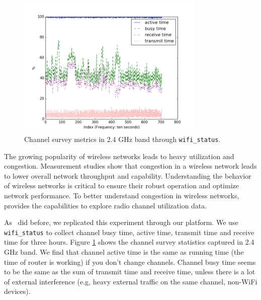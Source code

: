 \begin{figure}
\centering
\includegraphics[width=0.8\textwidth]{figure/channel.png}
\caption{Channel survey metrics in 2.4 GHz band through \texttt{wifi\_status}.} 
\label{fig:channelsurvey}
\end{figure}

The growing popularity of wireless networks leads to heavy utilization and congestion. Measurement studies show that congestion in a wireless network leads to lower overall network throughput and capability. Understanding the behavior of wireless networks is critical to ensure their robust operation and optimize network performance. To better understand congestion in wireless networks, \sysname provides the capabilities to explore radio channel utilization data. 

As~\cite{channelsurvey} did before, we replicated this experiment through our \sysname platform. We use \texttt{wifi\_status} to collect channel busy time, active time, transmit time and receive time for three hours. Figure \ref{fig:channelsurvey} shows the channel survey statistics captured in 2.4 GHz band. We find that channel active time is the same as running time (the time of router is working) if you don't change channels. Channel busy time seems to be the same as the sum of transmit time and receive time, unless there is a lot of external interference (e.g, heavy external traffic on the same channel, non-WiFi devices).

